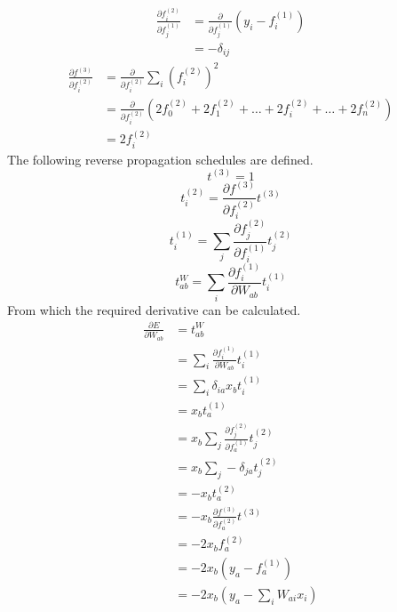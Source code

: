 \documentclass[fleqn]{report}
\begin{document}
\begin{equation}
    \begin{split}
        \frac{\partial f^{(2)}_i}{\partial f^{(1)}_j} & =
        \frac{\partial}{\partial f^{(1)}_j}\left ( y_i - f^{(1)}_i \right )\\
        & = - \delta_{ij}
    \end{split}
\end{equation}
\begin{equation}
    \begin{split}
        \frac{\partial f^{(3)}}{\partial f^{(2)}_i} & =
        \frac{\partial}{\partial f^{(2)}_i} \sum_i \left( f^{(2)}_i \right )^2\\
        & = \frac{\partial}{\partial f^{(2)}_i}
        \left ( 2 f^{(2)}_0 + 2 f^{(2)}_1 + \dots + 2 f^{(2)}_i + \dots + 2 f^{(2)}_n  \right ) \\
        & = 2 f^{(2)}_i
    \end{split}
\end{equation}
The following reverse propagation schedules are defined.
\begin{equation}
    t^{(3)} = 1
\end{equation}
\begin{equation}
    t^{(2)}_i = \frac{\partial f^{(3)}}{\partial f^{(2)}_i} t^{(3)}
\end{equation}
\begin{equation}
    t^{(1)}_i = \sum_j \frac{\partial f^{(2)}_j}{\partial f^{(1)}_i} t^{(2)}_j
\end{equation}
\begin{equation}
    t^{W}_{ab} = \sum_i \frac{\partial f^{(1)}_i}{\partial W_{ab}} t^{(1)}_i
\end{equation}
From which the required derivative can be calculated.
\begin{equation}
    \begin{split}
        \frac{\partial E}{\partial W_{ab}} & = t^{W}_{ab} \\
        & = \sum_i \frac{\partial f^{(1)}_i}{\partial W_{ab}} t^{(1)}_i \\
        & = \sum_i \delta_{ia} x_b t^{(1)}_i \\
        & = x_b t^{(1)}_a \\
        & = x_b \sum_j \frac{\partial f^{(2)}_j}{\partial f^{(1)}_a} t^{(2)}_j \\
        & = x_b \sum_j - \delta_{ja} t^{(2)}_j \\
        & = - x_b t^{(2)}_a \\
        & = - x_b \frac{\partial f^{(3)}}{\partial f^{(2)}_a} t^{(3)} \\
        & = - 2 x_b f^{(2)}_a \\
        & = - 2 x_b \left ( y_a - f^{(1)}_a \right ) \\
        & = - 2 x_b \left ( y_a - \sum_i W_{ai} x_i \right )
    \end{split}
\end{equation}
\end{document}
